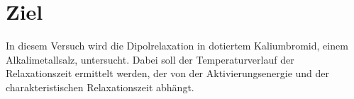 \section{Ziel}
\label{sec:Ziel}
In diesem Versuch wird die Dipolrelaxation in dotiertem Kaliumbromid, einem Alkalimetallsalz, untersucht. Dabei soll der Temperaturverlauf der Relaxationszeit ermittelt werden, der von der Aktivierungsenergie und der charakteristischen Relaxationszeit abhängt.

